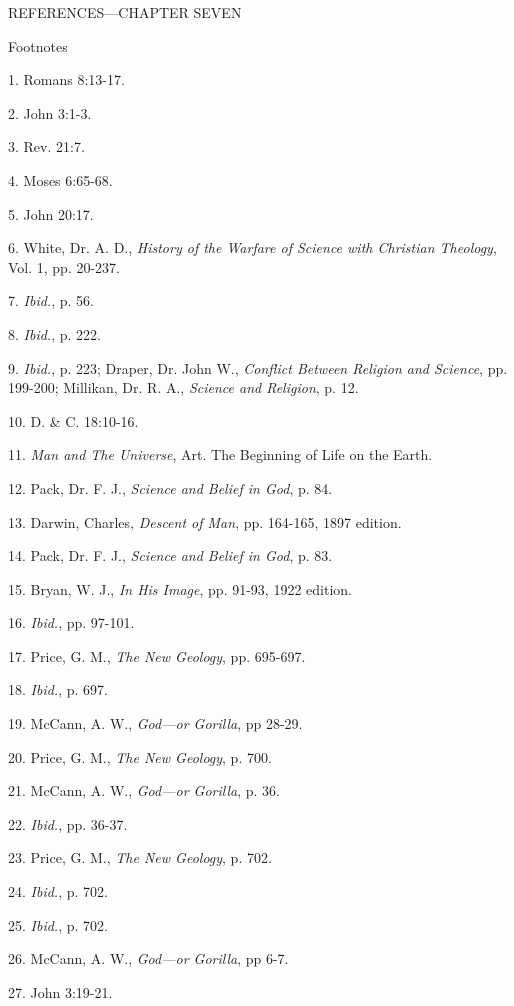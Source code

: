 \newpage
REFERENCES—CHAPTER SEVEN

Footnotes

1. Romans 8:13-17.

2. John 3:1-3.

3. Rev. 21:7.

4. Moses 6:65-68.

5. John 20:17.

6. White, Dr. A. D., \textit{History of the Warfare of Science with Christian Theology}, Vol. 1, pp.
20-237.

7. \textit{Ibid.}, p. 56.

8. \textit{Ibid.}, p. 222.

9. \textit{Ibid.}, p. 223; Draper, Dr. John W., \textit{Conflict Between Religion and Science}, pp. 199-200;
Millikan, Dr. R. A., \textit{Science and Religion}, p. 12.

10. D. \& C. 18:10-16.

11. \textit{Man and The Universe}, Art. The Beginning of Life on the Earth.

12. Pack, Dr. F. J., \textit{Science and Belief in God}, p. 84.

13. Darwin, Charles, \textit{Descent of Man}, pp. 164-165, 1897 edition.

14. Pack, Dr. F. J., \textit{Science and Belief in God}, p. 83.

15. Bryan, W. J., \textit{In His Image}, pp. 91-93, 1922 edition.

16. \textit{Ibid.}, pp. 97-101.

17. Price, G. M., \textit{The New Geology}, pp. 695-697.

18. \textit{Ibid.}, p. 697.

19. McCann, A. W., \textit{God—or Gorilla}, pp 28-29.

20. Price, G. M., \textit{The New Geology}, p. 700.

21. McCann, A. W., \textit{God—or Gorilla}, p. 36.

22. \textit{Ibid.}, pp. 36-37.

23. Price, G. M., \textit{The New Geology}, p. 702.

24. \textit{Ibid.}, p. 702.

25. \textit{Ibid.}, p. 702.

26. McCann, A. W., \textit{God—or Gorilla}, pp 6-7.

27. John 3:19-21.

